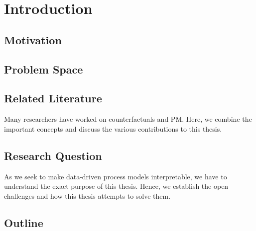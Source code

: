 \documentclass[12pt,a4paper]{report}
\begin{document}




\tableofcontents
\printglossary[type=acronym, title=List of terms, toctitle=List of terms]


\chapter{Introduction}
\label{sec:intro}

\section{Motivation}
\label{sec:motivation}


\section{Problem Space}
\label{sec:challenges}


% 

\section{Related Literature}
\label{sec:literature}
Many researchers have worked on counterfactuals and \Gls{PM}. Here, we combine the important concepts and discuss the various contributions to this thesis.



\section{Research Question}
\label{sec:rq}
As we seek to make data-driven process models interpretable, we have to understand the exact purpose of this thesis. Hence, we establish the open challenges and how this thesis attempts to solve them. 


\section{Outline}

\end{document}
